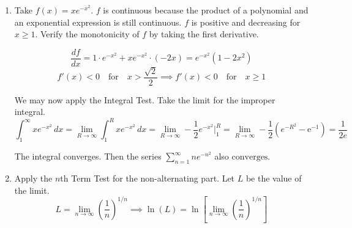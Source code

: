 \documentclass[a4paper, 12pt]{article}
\begin{document}
\begin{enumerate}[leftmargin=*,label=\textbf{\arabic*.}]
\begin{enumerate}[leftmargin=*,label=\textbf{\alph*.}]
\item\leavevmode

\vspace{-4.5em}
\begin{align*}A&=\int_0^1\left(x^2-\frac{x^2}2\right)\,dx+\int_1^2\left(x-\frac{x^2}2\right)\,dx=\left[\frac{x^3}3-\frac{x^3}6\right]_0^1+\left[\frac{x^2}2-\frac{x^3}6\right]_1^2\\[1em]&=\left[\left(\frac13-\frac16\right)-0\right]+\left[\left(2-\frac86\right)-\left(\frac12-\frac16\right)\right]=\boxed{\frac12}\end{align*}

\item $\displaystyle V=\int_D\pi\left[r_2^2(y)-r_1^2(y)\right]\,dy$
\[\boxed{V=\int_0^1\pi\left[\left(\sqrt{2y}\right)^2-\left(\sqrt y\right)^2\right]\,dy+\int_1^2\pi\left[\left(\sqrt{2y}\right)^2-y^2\right]\,dy}\]

\item $\displaystyle V=\int_D2\pi\cdot h(y)\cdot r(y)\,dy$
\[\boxed{V=\int_0^12\pi(2-y)\left(\sqrt{2y}-\sqrt{y}\right)dy+\int_1^22\pi(2-y)\left(\sqrt{2y}-y\right)dy}\]
\end{enumerate}

\item Take $f(x)=x e^{-x^2}$. $f$ is continuous because the product of a polynomial and an exponential expression is still continuous. $f$ is positive and decreasing for $x\geq1$. Verify the monotonicity of $f$ by taking the first derivative.

\[\frac{df}{dx}=1\cdot e^{-x^2}+x e^{-x^2}\cdot(-2x)= e^{-x^2}\left(1-2x^2\right)\]
\[f'(x)<0\quad\text{for}\quad x>\frac{\sqrt2}2\implies f'(x)<0\quad\text{for}\quad x\geq1\]

We may now apply the Integral Test. Take the limit for the improper integral.
\[\int_1^{\infty}x e^{-x^2}\,dx=\lim_{R\to\infty}\int_1^Rx e^{-x^2}\,dx=\lim_{R\to\infty}-\frac12 e^{-x^2}\Bigg|_1^R=\lim_{R\to\infty}-\frac12\left( e^{-R^2}-\mathrm{e^{-1}}\right)=\frac1{2 e}\]

The integral converges. Then the series $\displaystyle\sum_{n=1}^{\infty}n e^{-n^2}$ also $\boxed{\text{converges}}$.

\item Apply the $n$th Term Test for the non-alternating part. Let $L$ be the value of the limit.
\[L=\lim_{n\to\infty}\left(\frac1n\right)^{1/n}\implies\ln(L)=\ln\left[\lim_{n\to\infty}\left(\frac1n\right)^{1/n}\right]\]


\end{enumerate}
\end{document}
